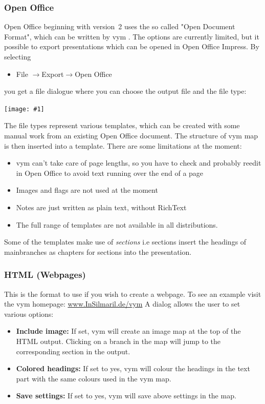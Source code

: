 \documentclass[12pt,a4paper]{article}
\newcommand{\maximage}[1]{  
    \begin{center}
        \texttt{[image: \#1]} 
    \end{center}
}
\newcommand{\vym}{{\sc vym }}
\newcommand{\ra}{$\longrightarrow$}
\begin{document}
\subsubsection{Open Office}
Open Office beginning with version~2 uses the so called "Open Document
Format", which can be written by \vym. The options are currently
limited, but it possible to export presentations which can be opened in
Open Office Impress. By selecting
\begin{itemize}
    \item File  \ra Export\ra Open Office
\end{itemize}
you get a file dialogue where you can choose the output file and the
file type:
    \maximage{images/export-oo.png}
The file types represent various templates, which can be created with
some manual work from an existing Open Office document. The structure of
\vym map is then inserted into a template.  There are some limitations
at the moment:
\begin{itemize}
    \item \vym can't take care of page lengths, so you have to check and
    probably reedit in Open Office to avoid text running over the end of
    a page
    \item Images and flags are not used at the moment
    \item Notes are just written as plain text, without RichText 
    \item The full range of templates are not available in all
    distributions.   
\end{itemize}
Some of the templates make use of {\em sections} i.e sections insert the
headings of mainbranches as chapters for sections into the presentation.

\subsubsection{HTML (Webpages)}
This is the format to use if you wish to create a webpage. To see an example
visit the \vym homepage: 
\href{http://www.InSilmaril.de/vym}{www.InSilmaril.de/vym}
A dialog allows the user to set various options:
\begin{itemize}
    \item {\bf Include image:} If set, \vym will create an image map at
    the top of the HTML output. Clicking on a branch in the map will
    jump to the corresponding section in the output.

    \item {\bf Colored headings:}
    If set to yes, \vym will colour the headings in the text part  with the
    same colours used in the \vym map.
    \item {\bf Save settings:}
    If set to yes, \vym will save above settings in the map.
\end{itemize}
\end{document}
